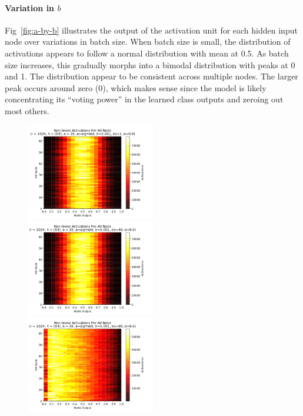 \documentclass[10pt,epsf]{article}
\begin{document}
{{    \paragraph{Variation in $b$}{
      Fig~\ref{fig:a-by-b} illustrates the output of the activation unit for each hidden input node
      over variations in batch size. When batch size is small, the distribution of activations
      appears to follow a normal distribution with mean at 0.5. As batch size increases, this
      gradually morphs into a bimodal distribution with peaks at 0 and 1. The distribution
      appear to be consistent across multiple nodes. The larger peak occurs around zero (0),
      which makes sense since the model is likely concentrating its ``voting power'' in the
      learned class outputs and zeroing out most others.
    }
    \begin{figure}[h]
      \includegraphics[width=0.5\textwidth]{./img/64-0.001-1-0-sigmoid-1/activations-A0-255.png}
      \includegraphics[width=0.5\textwidth]{./img/64-0.001-40-0-sigmoid-1/activations-A0-255.png}
      \includegraphics[width=0.5\textwidth]{./img/64-0.001-80-0-sigmoid-1/activations-A0-255.png}

\end{figure}}}
\end{document}
